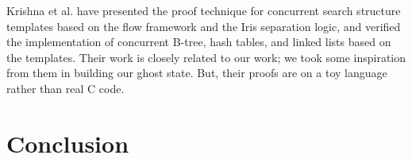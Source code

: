 \documentclass[acmsmall,screen]{acmart}\settopmatter{printfolios=true}
\begin{document}
Krishna et al. \cite{krishna2017flow} have presented the proof technique for concurrent search structure templates based on the flow framework and the Iris separation logic, and verified the implementation of concurrent B-tree, hash tables, and linked lists based on the templates. Their work is closely related to our work; we took some inspiration from them in building our ghost state. But, their proofs are on a toy language rather than real C code.

\section{Conclusion}
\label{conclusion}


\end{document}

